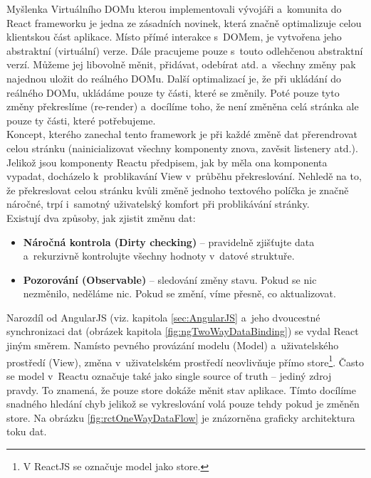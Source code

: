 
Myšlenka Virtuálního DOMu kterou implementovali vývojáři a~komunita do React frameworku je jedna ze zásadních novinek, která značně optimalizuje celou klientskou část aplikace. Místo přímé interakce s~DOMem, je vytvořena jeho abstraktní (virtuální) verze. Dále pracujeme pouze s~touto odlehčenou abstraktní verzí. Můžeme jej libovolně měnit, přidávat, odebírat atd. a~všechny změny pak najednou uložit do reálného DOMu. Další optimalizací je, že při ukládání do reálného DOMu, ukládáme pouze ty části, které se změnily. Poté pouze tyto změny překreslíme (re-render) a~docílíme toho, že není změněna celá stránka ale pouze ty části, které potřebujeme. \\

Koncept, kterého zanechal tento framework je při každé změně dat přerendrovat celou stránku (nainicializovat všechny komponenty znova, zavěsit listenery atd.). Jelikož jsou komponenty Reactu předpisem, jak by měla ona komponenta vypadat, docházelo k~problikavání View v~průběhu překreslování. Nehledě na to, že překreslovat celou stránku kvůli změně jednoho textového políčka je značně náročné, trpí i~samotný uživatelský komfort při problikávání stránky. \\

Existují dva způsoby, jak zjistit změnu dat:

\begin{itemize}  
	\item \textbf{Náročná kontrola (Dirty checking)} – pravidelně zjišťujte data a~rekurzivně kontrolujte všechny hodnoty v~datové struktuře.
	\item \textbf{Pozorování (Observable)} – sledování změny stavu. Pokud se nic nezměnilo, neděláme nic. Pokud se změní, víme přesně, co aktualizovat. \\
\end{itemize} 


Narozdíl od AngularJS (viz. kapitola \ref{sec:AngularJS} a~jeho dvoucestné synchronizaci dat (obrázek kapitola \ref{fig:ngTwoWayDataBinding}) se vydal React jiným směrem. Namísto pevného provázání modelu (Model) a~uživatelského prostředí (View), změna v~uživatelském prostředí neovlivňuje přímo store\footnote{V ReactJS se označuje model jako store.}. Často se model v~Reactu označuje také jako single source of truth -- jediný zdroj pravdy. To znamená, že pouze store dokáže měnit stav aplikace. Tímto docílíme snadného hledání chyb jelikož se vykreslování volá pouze tehdy pokud je změněn store. Na obrázku \ref{fig:rctOneWayDataFlow} je znázorněna graficky architektura toku dat.\cite{18}

